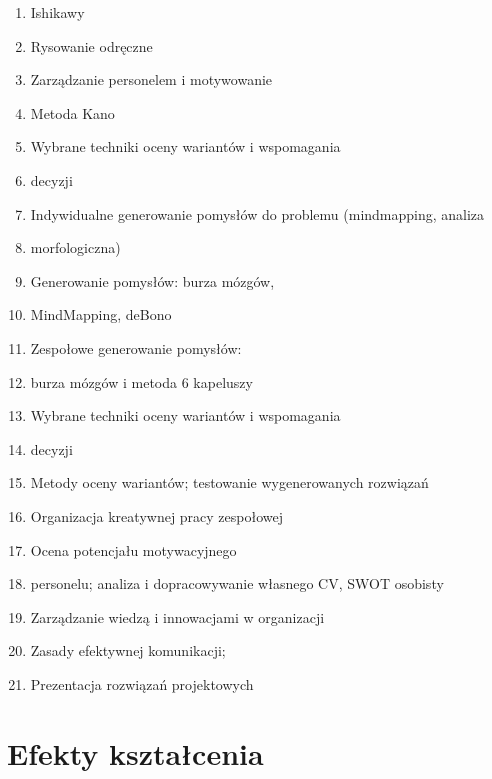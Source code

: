 \documentclass[12pt, a4paper]{article}
\begin{document}
\begin{enumerate}
  \item Ishikawy
  \item Rysowanie odręczne
  \item Zarządzanie personelem i motywowanie
  \item Metoda Kano
  \item Wybrane techniki oceny wariantów i wspomagania
  \item decyzji
  \item Indywidualne generowanie pomysłów do problemu (mindmapping, analiza
  \item morfologiczna)
  \item Generowanie pomysłów: burza mózgów,
  \item MindMapping, deBono
  \item Zespołowe generowanie pomysłów:
  \item burza mózgów i metoda 6 kapeluszy
  \item Wybrane techniki oceny wariantów i wspomagania
  \item decyzji
  \item Metody oceny wariantów; testowanie wygenerowanych rozwiązań
  \item Organizacja kreatywnej pracy zespołowej
  \item Ocena potencjału motywacyjnego
  \item personelu; analiza i dopracowywanie własnego CV, SWOT osobisty
  \item Zarządzanie wiedzą i innowacjami w organizacji
  \item Zasady efektywnej komunikacji;
  \item Prezentacja rozwiązań projektowych
\end{enumerate}

\section{Efekty kształcenia}
\end{document}
